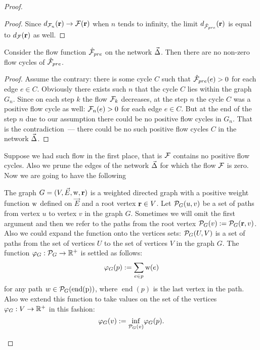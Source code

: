 \documentclass[12pt]{article}
\begin{document}
\begin{proof}
\begin{proof}
        Since $d_{\mathcal{F}_{n}}(\mathbf{r}) \to \mathcal{F}(\mathbf{r})$ when $n$ tends to infinity,
          the limit $d_{\mathcal{\hat{F}}_{pre}}(\mathbf{r})$ is equal to $d_{\mathcal{F}}(\mathbf{r})$ as well.
      \end{proof}
      \begin{prop}
        Consider the flow function $\mathcal{\hat{F}}_{pre}$ on the network $\vec{\Delta}$.
        Then there are no non-zero flow cycles of $\mathcal{\hat{F}}_{pre}$.
      \end{prop}
      \begin{proof}
        Assume the contrary: there is some cycle $C$ such that $\mathcal{\hat{F}}_{pre}(e) > 0$ for
          each edge $e \in C$.
        Obviously there exists such $n$ that the cycle $C$ lies within the graph $G_n$.
        Since on each step $k$ the flow $\mathcal{F}_{k}$ decreases, at the step $n$
          the cycle $C$ was a positive flow cycle as well: $\mathcal{F}_{n}(e) > 0$ for each edge $e \in C$.
        But at the end of the step $n$ due to our assumption there could be no positive flow cycles in $G_n$.
        That is the contradiction~--- there could be no such positive flow cycles $C$ in the network $\vec{\Delta}$.
      \end{proof}
      Suppose we had such flow in the first place, that is $\mathcal{F}$ contains no positive flow cycles.
      Also we prune the edges of the network $\vec{\Delta}$ for which the flow $\mathcal{F}$ is zero.
      Now we are going to have the following
      \begin{definition}
        The graph $G = (V, \vec{E},\mathrm{w}, \mathbf{r})$ is a weighted directed graph with a positive
          weight function $\mathrm{w}$ defined on $\vec{E}$ and a root vertex $\mathbf{r} \in V$.
        Let $\mathcal{P}_{G}(u, v)$ be a set of paths from vertex $u$ to vertex $v$ in the graph $G$.
        Sometimes we will omit the first argument and then we refer to the paths from the root vertex
          $\mathcal{P}_{G}(v) := \mathcal{P}_{G}(\mathbf{r}, v)$.
        Also we could expand the function onto the vertices sets: $\mathcal{P}_{G}(U,V)$ is a set of paths
          from the set of vertices $U$ to the set of vertices $V$ in the graph $G$.
        The function $\varphi_{G}: \mathcal{P}_{G} \to \mathbb{R}^{+}$ is settled as follows:
        \[
          \varphi_{G}(p) := \sum_{e \in p} \mathrm{w}(e)
        \]
        for any path $w \in \mathcal{P}_{G}(\operatorname{\operatorname{end}(p)})$, where $\operatorname{end}(p)$ is the last vertex in the path.
        Also we extend this function to take values on the set of the vertices $\varphi_{G}: V \to \mathbb{R}^{+}$ in this fashion:
        \[
          \varphi_{G}(v) := {\inf_{\mathcal{P}_{G}(v)}} \varphi_{G}(p).
        \]

\end{definition}
\end{proof}
\end{document}
